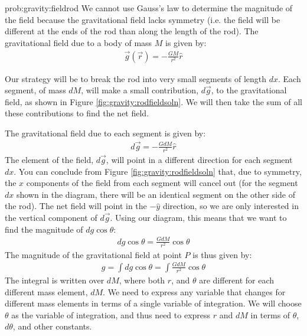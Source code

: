 \begin{solution}{prob:gravity:fieldrod}\label{soln:gravity:fieldrod}
We cannot use Gauss's law to determine the magnitude of the field because the gravitational field lacks symmetry (i.e. the field will be different at the ends of the rod than along the length of the rod). The gravitational field due to a body of mass $M$ is given by:
\begin{align*}
\vec g(\vec r)=-\frac{GM}{r^2}\hat{r}
\end{align*}

Our strategy will be to break the rod into very small segments of length $dx$. Each segment, of mass $dM$, will make a small contribution, $d\vec g$, to the gravitational field, as shown in Figure \ref{fig:gravity:rodfieldsoln}. We will then take the sum of all these contributions to find the net field. 


The gravitational field due to each segment is given by:
\begin{align*}
d\vec g=-\frac{GdM}{r^2}\hat{r}
\end{align*}
The element of the field, $d\vec g$, will point in a different direction for each segment $dx$. You can conclude from Figure \ref{fig:gravity:rodfieldsoln} that, due to symmetry, the $x$ components of the field from each segment will cancel out (for the segment $dx$ shown in the diagram, there will be an identical segment on the other side of the rod). The net field will point in the $-\hat{y}$ direction, so we are only interested in the vertical component of $d\vec g$. Using our diagram, this means that we want to find the magnitude of $dg\cos\theta$: 
\begin{align*}
dg\cos\theta=\frac{G dM}{r^2}\cos\theta
\end{align*}
The magnitude of the gravitational field at point $P$ is thus given by:
\begin{align*}
g = \int dg\cos\theta =\int \frac{G dM}{r^2}\cos\theta
\end{align*}
The integral is written over $dM$, where both $r$, and $\theta$ are different for each different mass element, $dM$. We need to express any variable that changes for different mass elements in terms of a single variable of integration. We will choose $\theta$ as the variable of integration, and thus need to express $r$ and $dM$ in terms of $\theta$, $d\theta$, and other constants. 


\end{solution}
